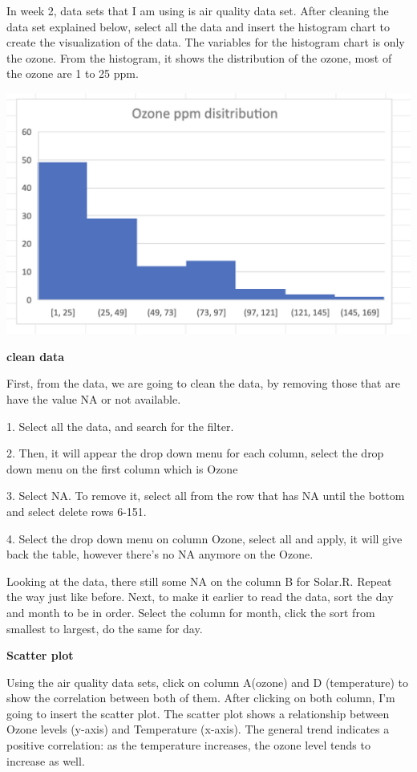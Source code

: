 \documentclass[
  letterpaper,
  DIV=11,
  numbers=noendperiod]{scrreprt}
\begin{document}
In week 2, data sets that I am using is air quality data set. After
cleaning the data set explained below, select all the data and insert
the histogram chart to create the visualization of the data. The
variables for the histogram chart is only the ozone. From the histogram,
it shows the distribution of the ozone, most of the ozone are 1 to 25
ppm.

\includegraphics{./histogramozone.png}

\textbf{clean data}

First, from the data, we are going to clean the data, by removing those
that are have the value NA or not available.

1. Select all the data, and search for the filter.

2. Then, it will appear the drop down menu for each column, select the
drop down menu on the first column which is Ozone

3. Select NA. To remove it, select all from the row that has NA until
the bottom and select delete rows 6-151.

4. Select the drop down menu on column Ozone, select all and apply, it
will give back the table, however there's no NA anymore on the Ozone.

Looking at the data, there still some NA on the column B for Solar.R.
Repeat the way just like before. Next, to make it earlier to read the
data, sort the day and month to be in order. Select the column for
month, click the sort from smallest to largest, do the same for day.

\textbf{Scatter plot}

Using the air quality data sets, click on column A(ozone) and D
(temperature) to show the correlation between both of them. After
clicking on both column, I'm going to insert the scatter plot. The
scatter plot shows a relationship between Ozone levels (y-axis) and
Temperature (x-axis). The general trend indicates a positive
correlation: as the temperature increases, the ozone level tends to
increase as well.
\end{document}

